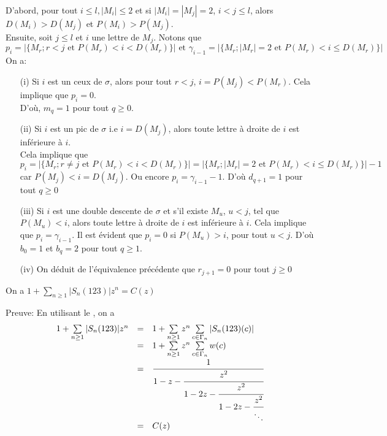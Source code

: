 D'abord, pour tout $i\leq l, |M_{i}|\leq 2 $ et si $|M_{i}|=|M_{j}|=2$, $i<j \leq l$, alors $D(M_{i})>D(M_{j})$ et
$P(M_{i})>P(M_{j})$.\vspace{5pt}\\
Ensuite, soit $j\leq l$ et $i$ une lettre de $M_{j}$. Notons que
$$p_{i}=| \{M_{r}; r<j \text{ et } P(M_{r})<i<D(M_{r})\} | \text{ et }\gamma_{i-1}=| \{M_{r};|M_{r}|=2 \text{ et } P(M_{r})<i \leq D(M_{r})\} |$$
On a:
\begin{itemize}
	\item [(i)] Si $i$ est un ceux de $\sigma$, alors pour tout $r<j$, $i=P(M_{j})<P(M_{r})$. Cela implique que $p_{i}=0$.\\
	      D'où, $m_{q}=1$ pour tout $q\geq 0$.
	\item [(ii)] Si $i$ est un pic de $\sigma$ i.e $i=D(M_{j})$, alors toute lettre à droite de $i$ est inférieure à $i$. \\
	      Cela implique que $$p_{i} = | \{M_{r}; r \neq j \text{ et } P(M_{r})<i<D(M_{r})\} | = | \{M_{r}; |M_{r}|=2 \text{ et } P(M_{r})<i \leq D(M_{r})\} |-1$$ car $P(M_{j})< i=D(M_{j})$. Ou encore $p_{i}=\gamma_{i-1}-1$. D'où $d_{q+1}=1$ pour tout $q\geq 0$
	\item [(iii)] Si $i$ est une double descente de $\sigma$ et s'il existe $M_{u}$, $u<j$, tel que $P(M_{u})<i$, alors toute lettre à droite de $i$ est inférieure à $i$. Cela implique que $p_{i}=\gamma_{i-1}$. Il est évident que $p_{i}=0$ si $P(M_{u})>i$, pour tout $u<j$. D'où  $b_{0}=1$ et $b_{q}=2$ pour tout $q\geq 1$.
	\item[(iv)] On déduit de l'équivalence précédente que $r_{j+1}=0$ pour tout $j \geq 0$
\end{itemize}
\begin{proposition}
	On a $1+\sum\limits_{n\geq 1}| S_{n}(123) |z^{n}=C(z)$
\end{proposition}
Preuve: En utilisant le , on a
\[
	\begin{array}{l l l}
		1+\sum\limits_{n\geq 1}| S_{n}(123) |z^{n} & = & 1+\sum\limits_{n\geq 1}z^{n}\sum\limits_{c\in \Gamma_{n}}|S_{n}(123)(c)|     \\
		                                           & = & 1+\sum\limits_{n\geq 1}z^{n}\sum\limits_{c\in \Gamma_{n}}w(c)                \\
		                                           & = & \cfrac{1}{1-z-\cfrac{z^{2}}{1-2z-\cfrac{z^{2}}{1-2z-\cfrac{z^{2}}{\ddots}}}} \\
		                                           & = & C(z)
	\end{array}
\]
